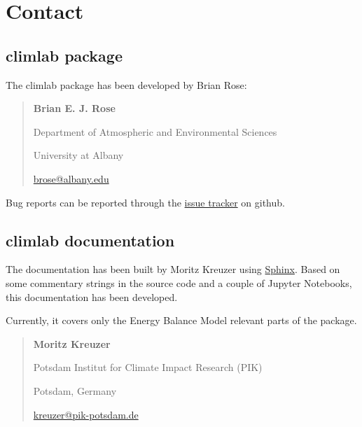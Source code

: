 \documentclass[a4paper,10pt,english]{sphinxmanual}
\begin{document}
\chapter{Contact}
\label{contact:contact}\label{contact::doc}

\section{climlab package}
\label{contact:climlab-package}
The climlab package has been developed by Brian Rose:
\begin{quote}

\begin{DUlineblock}{0em}
\item[] \textbf{Brian E. J. Rose}
\item[] Department of Atmospheric and Environmental Sciences
\item[] University at Albany
\item[] \href{mailto:brose@albany.edu}{brose@albany.edu}
\end{DUlineblock}
\end{quote}

Bug reports can be reported through the \href{https://github.com/brian-rose/climlab/issues}{issue tracker} on github.


\section{climlab documentation}
\label{contact:climlab-documentation}
The documentation has been built by Moritz Kreuzer using \href{http://www.sphinx-doc.org}{Sphinx}.
Based on some commentary strings in the source code and a couple of Jupyter Notebooks, this documentation has been developed.

Currently, it covers only the Energy Balance Model relevant parts of the package.
\begin{quote}

\begin{DUlineblock}{0em}
\item[] \textbf{Moritz Kreuzer}
\item[] Potsdam Institut for Climate Impact Research (PIK)
\item[] Potsdam, Germany
\item[] \href{mailto:kreuzer@pik-potsdam.de}{kreuzer@pik-potsdam.de}
\end{DUlineblock}
\end{quote}



\renewcommand{\indexname}{Index}
\end{document}
